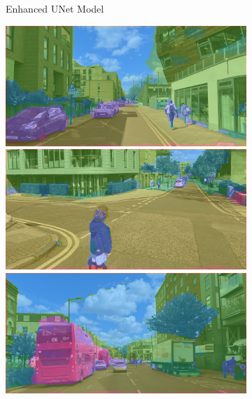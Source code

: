 \begin{figure}[H]
\begin{subfigure}[t]{.32\textwidth}
		\caption{Enhanced UNet Model}
	\end{subfigure}
	\hfill{}\begin{subfigure}[t]{.32\textwidth}
		\includegraphics[width=\textwidth]{city_images/HackneyScapes/Hackney3159_swin2_no_background.png} \\[5pt]
		\includegraphics[width=\textwidth]{city_images/HackneyScapes/Hackney3171_swin2_no_background.png} \\[5pt]
		\includegraphics[width=\textwidth]{city_images/HackneyScapes/Hackney3200_swin2_no_background.png} \\[5pt]

\end{subfigure}
\end{figure}
